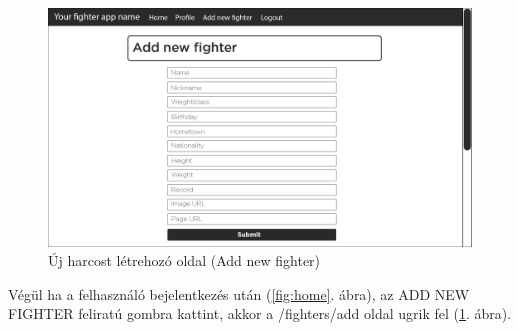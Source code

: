 \begin{figure}[htb]
\centering
\includegraphics[scale=0.7]{kepek/add_new_fighter.jpg}
\caption{Új harcost létrehozó oldal (Add new fighter)}
\label{fig:add}
\end{figure}
\newpage
Végül ha a felhasználó bejelentkezés után (\ref{fig:home}. ábra), az ADD NEW FIGHTER feliratú gombra kattint, akkor a /fighters/add oldal ugrik fel (\ref{fig:add}. ábra).
